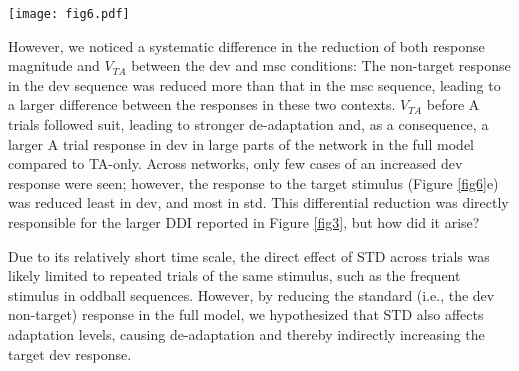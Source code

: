 \documentclass[pdflatex,referee,iicol,sn-basic]{sn-jnl}
\theoremstyle{thmstyleone}%
\theoremstyle{thmstyletwo}%
\theoremstyle{thmstylethree}%
\begin{document}
\begin{figure*}%
    \centering
    \texttt{[image: fig6.pdf]}
    \caption{Contrast between the ablated model with only TA (shown in Figure \ref{fig5}) and the full model with both STD and TA. \textbf{a}, \textbf{b} Data shown in Figure \ref{fig5}ab, dev and msc columns, subtracted from the corresponding data for the full model. \textbf{c} Equivalent contrast (full - ablated model) in the response to A, in columns as above. \textbf{d} Network-wide mean $V_{TA}$ before A trials across networks. Left: Ablated and full model averages. Right: Difference between these model conditions. With the introduction of STD, $V_{TA}$ decreased more in dev than in msc (t = -3.49, p = 0.000342). \textbf{e} Mean number of spikes per target trial across networks. Left: Ablated and full model averages. Right: Difference between these model conditions. With the introduction of STD, the response decreased more in the std sequence than msc (t = -1.9, p = 0.0297), and more in msc than in dev (t = -2.99, p = 0.00168)}
    \label{fig6}
\end{figure*}

However, we noticed a systematic difference in the reduction of both response magnitude and $V_{TA}$ between the dev and msc conditions: The non-target response in the dev sequence was reduced more than that in the msc sequence, leading to a larger difference between the responses in these two contexts. $V_{TA}$ before A trials followed suit, leading to stronger de-adaptation and, as a consequence, a larger A trial response in dev in large parts of the network in the full model compared to TA-only. Across networks, only few cases of an increased dev response were seen; however, the response to the target stimulus (Figure \ref{fig6}e) was reduced least in dev, and most in std. This differential reduction was directly responsible for the larger DDI reported in Figure \ref{fig3}, but how did it arise?

Due to its relatively short time scale, the direct effect of STD across trials was likely limited to repeated trials of the same stimulus, such as the frequent stimulus in oddball sequences. However, by reducing the standard (i.e., the dev non-target) response in the full model, we hypothesized that STD also affects adaptation levels, causing de-adaptation and thereby indirectly increasing the target dev response.
\end{document}
